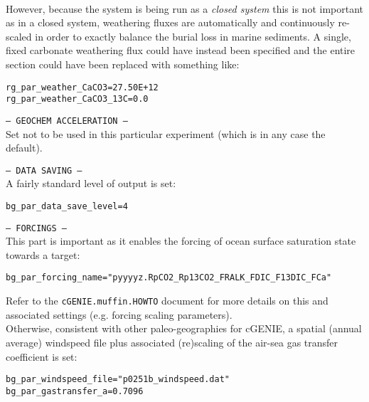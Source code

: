 \documentclass[10pt,twoside]{article}
\begin{document}
\begin{compactitem}
\\ However, because the system is being run as a \textit{closed system} this is not important as in a closed system, weathering fluxes are automatically and continuously re-scaled in order to exactly balance the burial loss in marine sediments. A single, fixed carbonate weathering flux could have instead been specified and the entire section could have been replaced with something like:
\vspace{-5pt}\begin{verbatim}
rg_par_weather_CaCO3=27.50E+12
rg_par_weather_CaCO3_13C=0.0
                \end{verbatim}\vspace{-5pt}
                \item \texttt{--- GEOCHEM ACCELERATION ---}
                \\ Set not to be used in this particular experiment (which is in any case the default).
                \item \texttt{--- DATA SAVING ---}
                \\ A fairly standard level of output is set:
\vspace{-5pt}\begin{verbatim}
bg_par_data_save_level=4
                \end{verbatim}\vspace{-5pt}
                \item \texttt{--- FORCINGS ---}
                \\ This part is important as it enables the forcing of ocean surface saturation state towards a target:
\vspace{-5pt}\begin{verbatim}
bg_par_forcing_name="pyyyyz.RpCO2_Rp13CO2_FRALK_FDIC_F13DIC_FCa"
                \end{verbatim}\vspace{-10pt}
 Refer to the \texttt{cGENIE.muffin.HOWTO} document for more details on this and associated settings (e.g. forcing scaling parameters).
                \\ Otherwise, consistent with other paleo-geographies for cGENIE, a spatial (annual average) windspeed file plus associated (re)scaling of the air-sea gas transfer coefficient is set:
\vspace{-5pt}\begin{verbatim}
bg_par_windspeed_file="p0251b_windspeed.dat"
bg_par_gastransfer_a=0.7096
                \end{verbatim}\vspace{-5pt}
        \end{compactitem}
        
\end{document}
